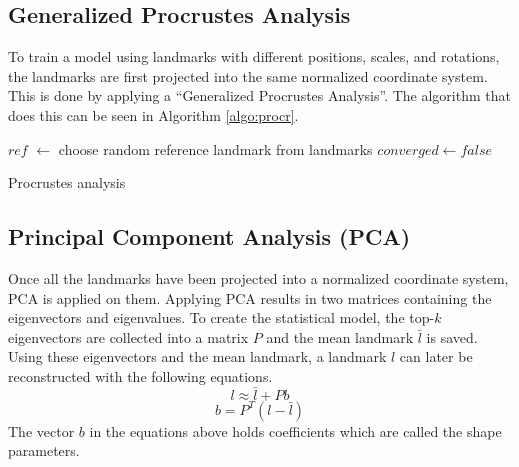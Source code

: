 \documentclass[a4paper]{article}
\begin{document}
\subsection{Generalized Procrustes Analysis}
To train a model using landmarks with different positions, scales, and rotations, the landmarks are first projected into the same normalized coordinate system. 
This is done by applying a ``Generalized Procrustes Analysis''.
The algorithm that does this can be seen in Algorithm \ref{algo:procr}.

\begin{algorithm}[!tbp]
\BlankLine

$ref$ $\leftarrow$ choose random reference landmark from landmarks\;
$converged \leftarrow false$\;
 \caption{Procrustes analysis}
 \label{algo:procr}
\end{algorithm}

\subsection{Principal Component Analysis (PCA)}
\label{subsect:pca}
Once all the landmarks have been projected into a normalized coordinate system, PCA is applied on them.
Applying PCA results in two matrices containing the eigenvectors and eigenvalues.
To create the statistical model, the top-$k$ eigenvectors are collected into a matrix $P$ and the mean landmark $\bar{l}$ is saved.
Using these eigenvectors and the mean landmark, a landmark $l$ can later be reconstructed with the following equations.
\begin{equation}
l \approx \bar{l} + Pb
\end{equation}
\begin{equation}
b = P^T (l - \bar{l})
\end{equation}
The vector $b$ in the equations above holds coefficients which are called the shape parameters.
\end{document}
